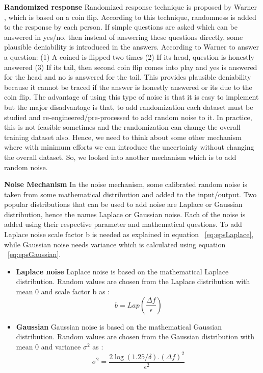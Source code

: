 \textbf{Randomized response}
Randomized response technique is proposed by Warner \cite{14}, which is based on a coin flip. According to this technique, randomness is added to the response by each person. If simple questions are asked which can be answered in yes/no, then instead of answering these questions directly, some plausible deniability is introduced in the answers. According to Warner to answer a question: (1) A coined is flipped two times (2) If its head, question is honestly answered (3) If its tail, then second coin flip comes into play and yes is answered for the head and no is answered for the tail. This provides plausible deniability because it cannot be traced if the answer is honestly answered or its due to the coin flip. The advantage of using this type of noise is that it is easy to implement but the major disadvantage is that, to add randomization each dataset must be studied and re-engineered/pre-processed to add random noise to it. In practice, this is not feasible sometimes and the randomization can change the overall training dataset also. Hence, we need to think about some other mechanism where with minimum efforts we can introduce the uncertainty without changing the overall dataset. So, we looked into another mechanism which is to add random noise.

\textbf{Noise Mechanism}
In the noise mechanism, some calibrated random noise is taken from some mathematical distribution and added to the input/output. Two popular distributions that can be used to add noise are Laplace or Gaussian distribution, hence the names Laplace or Gaussian noise. Each of the noise is added using their respective parameter and mathematical questions. To add Laplace noise scale factor b is needed as explained in equation ~\ref{eq:epsLaplace}, while Gaussian noise needs variance which is calculated using equation ~\ref{eq:epsGaussian}.
\begin{itemize}
    \item \textbf{Laplace noise}
Laplace noise is based on the mathematical Laplace distribution. Random values are chosen from the Laplace distribution with mean 0 and scale factor b as :
\begin{equation}
b= Lap(\frac{\Delta f} { \epsilon})
\label{eq:epsLaplace}
\end{equation}
  \item \textbf{Gaussian}
Gaussian noise is based on the mathematical Gaussian distribution. Random values are chosen from the Gaussian distribution with mean 0 and variance $\sigma^2$  as :
\begin{equation}
\sigma^2=\frac{2\log(1.25/\delta).(\Delta f)^2}{\epsilon^2}
\label{eq:epsGaussian}
\end{equation}
\end{itemize}

